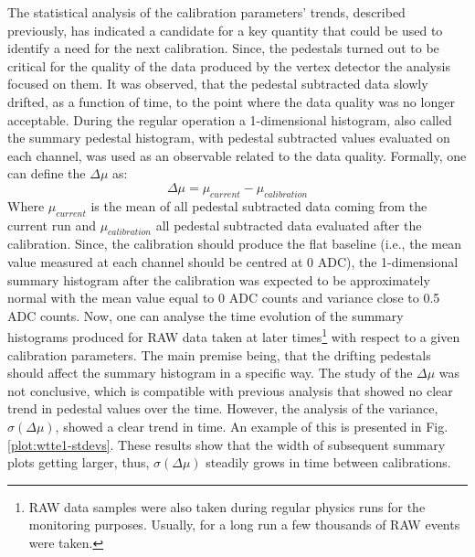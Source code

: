 The statistical analysis of the calibration parameters' trends, described previously, has indicated a candidate for a key quantity that could be used to identify a need for the next calibration. Since, the pedestals turned out to be critical for the quality of the data produced by the vertex detector the analysis focused on them. It was observed, that the pedestal subtracted data slowly drifted, as a function of time, to the point where the data quality was no longer acceptable. During the regular operation a 1-dimensional histogram, also called the summary pedestal histogram, with pedestal subtracted values evaluated on each channel, was used as an observable related to the data quality. Formally, one can define the $\Delta\mu$ as:
\begin{equation}
    \Delta\mu = \mu_{current} - \mu_{calibration}
\end{equation}
Where $\mu_{current}$ is the mean of all pedestal subtracted data coming from the current run and $\mu_{calibration}$ all pedestal subtracted data evaluated after the calibration. Since, the calibration should produce the flat baseline (i.e., the mean value measured at each channel should be centred at 0 ADC), the 1-dimensional summary histogram after the calibration was expected to be approximately normal with the mean value equal to 0 ADC counts and variance close to 0.5 ADC counts. Now, one can analyse the time evolution of the summary histograms produced for RAW data taken at later times\footnote{RAW data samples were also taken during regular physics runs for the monitoring purposes. Usually, for a long run a few thousands of RAW events were taken.} with respect to a given calibration parameters. The main premise being, that the drifting pedestals should affect the summary histogram in a specific way. The study of the $\Delta\mu$ was not conclusive, which is compatible with previous analysis that showed no clear trend in pedestal values over the time.
However, the analysis of the variance, $\sigma(\Delta\mu)$, showed a clear trend in time. An example of this is presented in Fig.
\ref{plot:wtte1-stdevs}. These results show that the width of subsequent summary plots getting larger, thus, $\sigma(\Delta\mu)$ steadily grows in time between calibrations.

